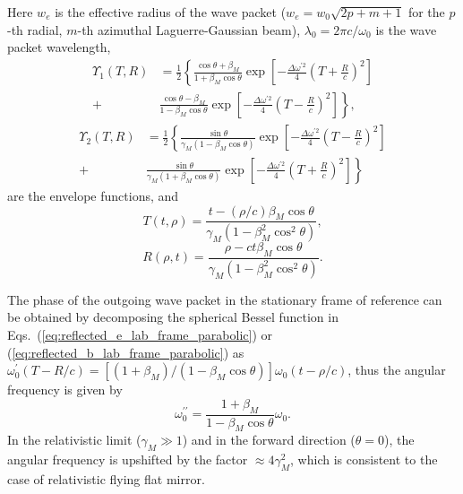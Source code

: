 \documentclass[10pt, a4paper, twoside, openright]{report}
\begin{document}
Here $ w_e $ is the effective radius of the wave packet ($ w_e = w_0 \sqrt{2p + m + 1}$ for the $ p $-th radial, $ m $-th azimuthal Laguerre-Gaussian beam), $ \lambda_0 = 2 \pi c / \omega_0 $ is the wave packet wavelength,
\begin{equation}\label{eq:envelope_function_1}
\begin{aligned}
\Upsilon_1 \left(T, R \right) & = \frac{1}{2} \left\lbrace \frac{\cos \theta + \beta_M}{1 + \beta_M \cos \theta} \exp \left[- \frac{\Delta \omega^{\prime 2}}{4} \left( T + \frac{R}{c} \right)^2 \right] \right. \\
+ & \left. \frac{\cos \theta - \beta_M}{1 - \beta_M \cos \theta} \exp \left[- \frac{\Delta \omega^{\prime 2}}{4} \left( T - \frac{R}{c} \right)^2 \right] \right\rbrace,
\end{aligned}
\end{equation}
\begin{equation}\label{eq:envelope_function_2}
\begin{aligned}
\Upsilon_2 \left(T, R \right) & = \frac{1}{2} \left\lbrace \frac{\sin \theta}{\gamma_M \left( 1 - \beta_M \cos \theta \right) } \exp \left[- \frac{\Delta \omega^{\prime 2}}{4} \left( T - \frac{R}{c} \right)^2 \right] \right. \\
+ & \left. \frac{\sin \theta}{\gamma_M \left( 1 + \beta_M \cos \theta \right) } \exp \left[- \frac{\Delta \omega^{\prime 2}}{4} \left( T + \frac{R}{c} \right)^2 \right] \right\rbrace
\end{aligned}
\end{equation}
are the envelope functions, and
\begin{equation}\label{eq:T}
T \left(t, \rho \right) = \frac{t - \left(\rho / c\right) \beta_M \cos \theta}{\gamma_M \left( 1 - \beta_M^2 \cos^2 \theta \right)},
\end{equation}
\begin{equation}\label{eq:R}
R \left(\rho, t \right) = \frac{\rho - c t \beta_M \cos \theta}{\gamma_M \left( 1 - \beta_M^2 \cos^2 \theta \right)}.
\end{equation}

The phase of the outgoing wave packet in the stationary frame of reference can be obtained by decomposing the spherical Bessel function in Eqs.~(\ref{eq:reflected_e_lab_frame_parabolic}) or (\ref{eq:reflected_b_lab_frame_parabolic}) as $ \omega_0^{\prime} \left( T - R / c \right) = \left[ \left( 1 + \beta_M \right) / \left( 1 - \beta_M \cos \theta \right) \right] \omega_0 \left( t - \rho / c \right) $, thus the angular frequency is given by \cite{Jeong2021}
\begin{equation}\label{eq:upshift_factor_parabolic}
	\omega_0^{\prime \prime} = \frac{1 + \beta_M}{1 - \beta_M \cos \theta} \omega_0.
\end{equation}
In the relativistic limit ($ \gamma_M \gg 1 $) and in the forward direction ($ \theta = 0 $), the angular frequency is upshifted by the factor $ \approx 4 \gamma_M^2 $, which is consistent to the case of relativistic flying flat mirror.
\end{document}
